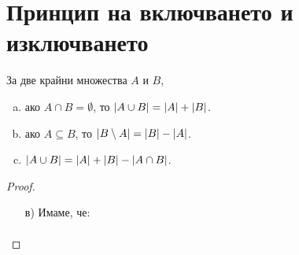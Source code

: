\section{Принцип на включването и изключването}

\begin{prop}
  За две крайни множества $A$ и $B$,
  \begin{enumerate}[a)]
  \item 
    ако $A \cap B = \emptyset$, то $\lvert{A\cup B}\rvert = \lvert{A}\rvert + \lvert{B}\rvert$.
  \item
    ако $A\subseteq B$, то $\lvert{B\setminus A}\rvert = \lvert{B}\rvert - \lvert{A}\rvert$.
  \item
    $\lvert{A\cup B}\rvert = \lvert{A}\rvert + \lvert{B}\rvert - \lvert{A\cap B}\rvert$.
  \end{enumerate}
\end{prop}
\begin{proof}
  \begin{enumerate}[a)]
  \item[в)]
    Имаме, че:
    \begin{align*}

\end{align*}
\end{enumerate}
\end{proof}
